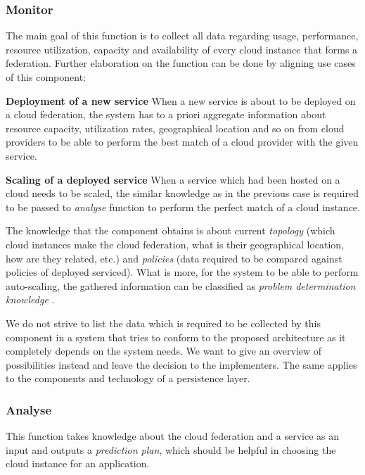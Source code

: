 \subsubsection{Monitor}
The main goal of this function is to collect all data regarding usage, performance, resource utilization, capacity and availability of every cloud instance that forms a federation. Further elaboration on the function can be done by aligning use cases of this component:
\begin{asparaenum}
  \item[\textbf{Deployment of a new service}] When a new service is about to be deployed on a cloud federation, the system has to a priori aggregate information about resource capacity, utilization rates, geographical location and so on from cloud providers to be able to perform the best match of a cloud provider with the given service.
  \item[\textbf{Scaling of a deployed service}] When a service which had been hosted on a cloud needs to be scaled, the similar knowledge as in the previous case is required to be passed to \emph{analyse} function to perform the perfect match of a cloud instance.
\end{asparaenum}

The knowledge that the component obtains is about current \emph{topology} (which cloud instances make the cloud federation, what is their geographical location, how are they related, etc.) and \emph{policies} (data required to be compared against policies of deployed serviced). What is more, for the system to be able to perform auto-scaling, the gathered information can be classified as \emph{problem determination knowledge} \cite{IBM06}.

We do not strive to list the data which is required to be collected by this component in a system that tries to conform to the proposed architecture as it completely depends on the system needs. We want to give an overview of possibilities instead and leave the decision to the implementers. The same applies to the components and technology of a persistence layer.

\subsubsection{Analyse}
This function takes knowledge about the cloud federation and a service as an input and outputs a \emph{prediction plan}, which should be helpful in choosing the cloud instance for an application.

